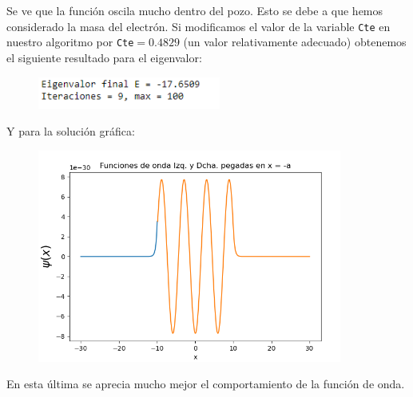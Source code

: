 \documentclass[11pt]{article}
\begin{document}
	Se ve que la función oscila mucho dentro del pozo. Esto se debe a que hemos considerado la masa del electrón. Si modificamos el valor de la variable \texttt{Cte} en nuestro algoritmo por \texttt{Cte}$=0.4829$ (un valor relativamente adecuado) obtenemos el siguiente resultado para el eigenvalor:
	\begin{figure}[h]
		\centering
		\includegraphics[width=6cm]{Img/2.15.PNG}
	\end{figure}
	
	Y para la solución gráfica:
	\begin{figure}[h!]
		\centering
		\includegraphics[width=10cm]{Img/2.16.PNG}
	\end{figure}
	
	En esta última se aprecia mucho mejor el comportamiento de la función de onda.
	
	
	
	
	
	
	
	
	
	
\end{document}
